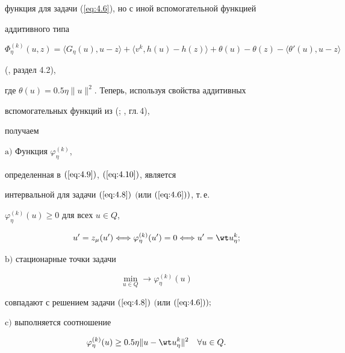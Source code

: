 функция для задачи (\ref{eq:4.6}), но с иной вспомогательной функцией 


аддитивного типа


\begin{equation} \label{eq:4.11} 


\Phi^{(k)}_{\eta} (u,z)=\langle G_{\eta} (u), u - z \rangle 


+\langle v^{k} , h(u) - h(z) \rangle+\theta (u) - \theta (z) 


 - \langle \theta' (u), u-z \rangle 


\end{equation} 


(\cite{Pat99}, раздел 4.2), 


где $\theta (u)=0.5 \eta \| u \|^2$. Теперь, используя свойства аддитивных 


вспомогательных функций из (\cite{Pat97}; \cite{Pat99}, гл.\,4), 


получаем





\begin{prop} \label{pro:4.3}


$\mathrm{a)}$ Функция $\varphi^{(k)}_{\eta}$,


определенная в $(\ref{eq:4.9})$, $(\ref{eq:4.10})$, является 


интервальной для задачи $(\ref{eq:4.8})$ $($или $(\ref{eq:4.6}))$, т.\,е. 


$\varphi^{(k)}_{\eta} (u) \geq 0$ для всех $u \in Q$,


$$


u'=z_{\mu} (u') \Longleftrightarrow \varphi^{(k)}_{\eta} (u')=0


\Longleftrightarrow u'=\wt u^{k}_{\eta};


$$





$\mathrm{b)}$ стационарные точки задачи 


\begin{equation} \label{eq:4.12} 


\min_{u \in Q} \rightarrow \varphi^{(k)}_{\eta} (u) 


\end{equation}


совпадают с решением задачи $(\ref{eq:4.8})$ $($или $(\ref{eq:4.6}));$





$\mathrm{c)}$ выполняется соотношение


\begin{equation} \label{eq:4.13} 


\varphi^{(k)}_{\eta} (u) \geq 0.5 \eta \| u - \wt u^{k}_{\eta} \|^2


\quad \forall u \in Q.


\end{equation}


\end{prop}





